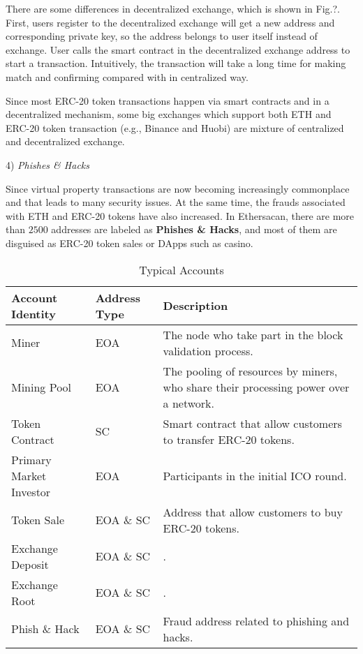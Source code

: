There are some differences in decentralized exchange, which is shown in Fig.?. First, users register to the decentralized exchange will get a new address and corresponding private key, so the address belongs to user itself instead of exchange. User calls the smart contract in the decentralized exchange address to start a transaction. Intuitively, the transaction will take a long time for making match and confirming compared with in centralized way.

Since most ERC-20 token transactions happen via smart contracts and in a decentralized mechanism, some big exchanges which support both ETH and ERC-20 token transaction (e.g., Binance and Huobi) are mixture of centralized and decentralized exchange. 

4) \emph{Phishes \& Hacks}

Since virtual property transactions are now becoming increasingly commonplace and that leads to many security issues. At the same time, the frauds associated with ETH and ERC-20 tokens have also increased. In Ethersacan, there are more than $2500$ addresses are labeled as \textbf{Phishes \& Hacks}, and most of them are disguised as ERC-20 token sales or DApps such as casino. 

\begin{table}[htbp]
\caption{Typical Accounts}
\begin{center}
\begin{tabular}{|p{2.1cm}|p{1.7cm}|p{3.5cm}|}
\hline
\textbf{Account Identity} & \textbf{Address Type}& \textbf{Description} \\
\hline
Miner & EOA & The node who take part in the block validation process. \\ \hline
Mining Pool & EOA & The pooling of resources by miners, who share their processing power over a network.\\ \hline
Token Contract & SC & Smart contract that allow customers to transfer ERC-20 tokens. \\ \hline
Primary Market Investor & EOA & Participants in the initial ICO round. \\ \hline
Token Sale & EOA \& SC & Address that allow customers to buy ERC-20 tokens. \\ \hline
Exchange Deposit & EOA \& SC & . \\ \hline
Exchange Root & EOA \& SC & . \\ \hline
Phish \& Hack & EOA \& SC & Fraud address related to phishing and hacks. \\ \hline
\end{tabular}
\label{tab1}
\end{center}
\end{table}



